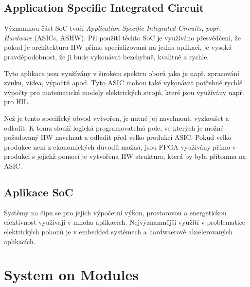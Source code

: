 \documentclass[a4paper, twoside, 11pt]{article}
\begin{document}
	\subsection{Application Specific Integrated Circuit}
		Významnou část SoC tvoří \textit{Application Specific Integrated Circuits, popř. Hardware} (ASICs, ASHW). Při použití těchto SoC je využíváno přesvědčení, že pokud je architektura HW přímo specializovaná na jednu aplikaci, je vysoká pravděpodobnost, že ji bude vykonávat bezchybně, kvalitně a rychle.\par
		Tyto aplikace jsou využívány v širokém spektru oborů jako je např. zpracování zvuku, videa, výpočtů apod. Tyto ASIC mohou také vykonávat potřebné rychlé výpočty pro matematické modely elektrických strojů, které jsou využívány např. pro HIL.\par
		Než je tento specifický obvod vytvořen, je nutné jej navrhnout, vyzkoušet a odladit. K tomu slouží logická programovatelná pole, ve kterých je možné požadovaný HW navrhnut a odladit před velko produkcí ASIC. Pokud velko produkce není z ekonomických důvodů možná, jsou FPGA využívány přímo v produkci s jejichž pomocí je vytvořena HW struktura, která by byla přítomna na ASIC.


	\subsection{Aplikace SoC}
	Systémy na čipu se pro jejich výpočetní výkon, prostorovou a energetickou efektivnost využívají v mnoha aplikacích. Nejvýznamnější využití v problematice elektrických pohonů je v embedded systémech a hardwaerově akcelerovaných aplikacích.

\section{System on Modules}
\end{document}
